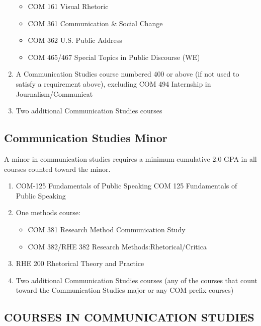 \documentclass[
  letterpaper,
]{scrbook}
\providecommand{\tightlist}{%
  \setlength{\itemsep}{0pt}\setlength{\parskip}{0pt}}
\begin{document}
\begin{enumerate}
  \begin{itemize}
  \tightlist
  \item
    COM 161 Visual Rhetoric
  \item
    COM 361 Communication \& Social Change
  \item
    COM 362 U.S. Public Address
  \item
    COM 465/467 Special Topics in Public Discourse (WE)
  \end{itemize}
\item
  A Communication Studies course numbered 400 or above (if not used to
  satisfy a requirement above), excluding COM 494 Internship in
  Journalism/Communicat
\item
  Two additional Communication Studies courses
\end{enumerate}

\subsection{Communication Studies
Minor}\label{communication-studies-minor}

A minor in communication studies requires a minimum cumulative 2.0 GPA
in all courses counted toward the minor.

\begin{enumerate}
\def\labelenumi{\arabic{enumi}.}
\tightlist
\item
  COM-125 Fundamentals of Public Speaking COM 125 Fundamentals of Public
  Speaking
\item
  One methods course:

  \begin{itemize}
  \tightlist
  \item
    COM 381 Research Method Communication Study
  \item
    COM 382/RHE 382 Research Methods:Rhetorical/Critica
  \end{itemize}
\item
  RHE 200 Rhetorical Theory and Practice
\item
  Two additional Communication Studies courses (any of the courses that
  count toward the Communication Studies major or any COM prefix
  courses)
\end{enumerate}

\subsection{COURSES IN COMMUNICATION
STUDIES}\label{courses-in-communication-studies}
\end{document}

